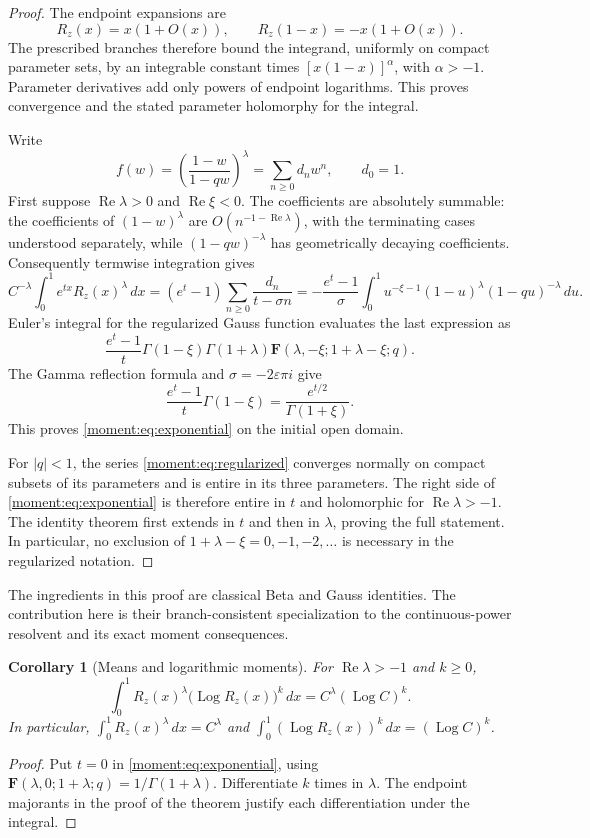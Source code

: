 \documentclass[11pt,a4paper]{article}
\numberwithin{equation}{section}
\newtheorem{corollary}[theorem]{Corollary}
\theoremstyle{definition}
\theoremstyle{remark}
\begin{document}
\begin{proof}
The endpoint expansions are
\[
 R_z(x)=x(1+O(x)),\qquad
 R_z(1-x)=-x(1+O(x)).
\]
The prescribed branches therefore bound the integrand, uniformly on
compact parameter sets, by an integrable constant times
$[x(1-x)]^{\alpha}$, with $\alpha>-1$. Parameter derivatives add
only powers of endpoint logarithms. This proves convergence and the
stated parameter holomorphy for the integral.

Write
\[
 f(w)=\left(\frac{1-w}{1-qw}\right)^\lambda
      =\sum_{n\ge0}d_nw^n,
 \qquad d_0=1.
\]
First suppose $\operatorname{Re}\lambda>0$ and
$\operatorname{Re}\xi<0$. The coefficients are absolutely summable:
the coefficients of $(1-w)^\lambda$ are
$O(n^{-1-\operatorname{Re}\lambda})$, with the terminating cases
understood separately, while $(1-qw)^{-\lambda}$ has geometrically
decaying coefficients. Consequently termwise integration gives
\[
 C^{-\lambda}\int_0^1e^{tx}R_z(x)^\lambda\,dx
 =(e^t-1)\sum_{n\ge0}\frac{d_n}{t-\sigma n}
 =-\frac{e^t-1}{\sigma}\int_0^1
        u^{-\xi-1}(1-u)^\lambda(1-qu)^{-\lambda}\,du.
\]
Euler's integral for the regularized Gauss function
\cite[15.6.1]{DLMF} evaluates the last expression as
\[
 \frac{e^t-1}{t}
 \Gamma(1-\xi)\Gamma(1+\lambda)
 \mathbf F(\lambda,-\xi;1+\lambda-\xi;q).
\]
The Gamma reflection formula and $\sigma=-2\varepsilon\pi i$ give
\[
 \frac{e^t-1}{t}\Gamma(1-\xi)
       =\frac{e^{t/2}}{\Gamma(1+\xi)}.
\]
This proves \eqref{moment:eq:exponential} on the initial open domain.

For $|q|<1$, the series \eqref{moment:eq:regularized} converges
normally on compact subsets of its parameters and is entire in its
three parameters. The right side of \eqref{moment:eq:exponential}
is therefore entire in $t$ and holomorphic for
$\operatorname{Re}\lambda>-1$. The identity theorem first extends
in $t$ and then in $\lambda$, proving the full statement. In
particular, no exclusion of $1+\lambda-\xi=0,-1,-2,\ldots$ is
necessary in the regularized notation.
\end{proof}

The ingredients in this proof are classical Beta and Gauss identities.
The contribution here is their branch-consistent specialization to the
continuous-power resolvent and its exact moment consequences.

\begin{corollary}[Means and logarithmic moments]
\label{moment:cor:mean}
For $\operatorname{Re}\lambda>-1$ and $k\ge0$,
\begin{equation}\label{moment:eq:meanlogs}
 \int_0^1 R_z(x)^\lambda
       \bigl(\operatorname{Log}R_z(x)\bigr)^k\,dx
       =C^\lambda(\operatorname{Log}C)^k.
\end{equation}
In particular, $\int_0^1R_z(x)^\lambda\,dx=C^\lambda$ and
$\int_0^1(\operatorname{Log}R_z(x))^k\,dx=(\operatorname{Log}C)^k$.
\end{corollary}
\begin{proof}
Put $t=0$ in \eqref{moment:eq:exponential}, using
$\mathbf F(\lambda,0;1+\lambda;q)=1/\Gamma(1+\lambda)$.
Differentiate $k$ times in $\lambda$. The endpoint majorants in the
proof of the theorem justify each differentiation under the integral.
\end{proof}
\end{document}
